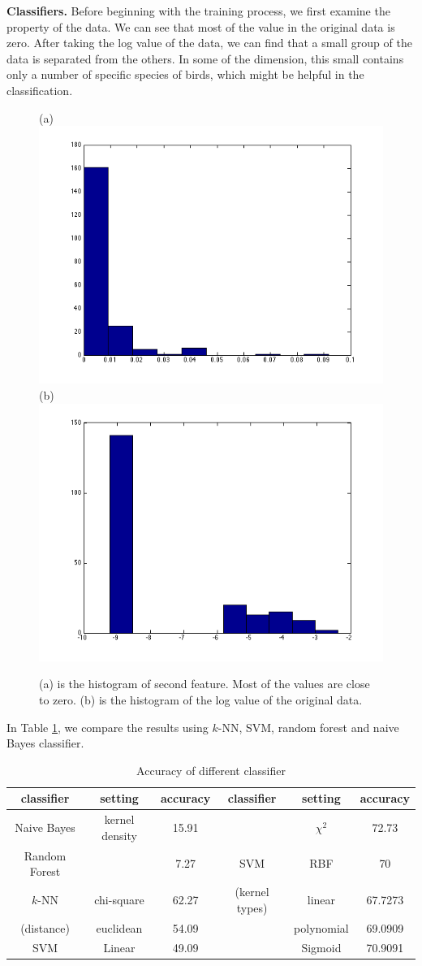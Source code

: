 \documentclass{article} %
\begin{document}
\textbf{Classifiers.}
Before beginning with the training process, we first examine the property of the data. We can see that most of the value in the original data is zero. After taking the log value of the data, we can find that a small group of the data is separated from the others. In some of the dimension, this small contains only a number of specific species of birds, which might be helpful in the classification.

\begin{figure}[b!]
    \centering
    {(a)\includegraphics[width=0.38\linewidth]{../Figure/Train_features}
    (b)\includegraphics[width=0.38\linewidth]{../Figure/Train_features_log}}
    \caption{(a) is the histogram of second feature. Most of the values are close to zero. (b) is the histogram of the log value of the original data.}
    \label{fig:hist}
\end{figure}


In Table \ref{tbl:classifers}, we compare the results using $k$-NN, SVM, random forest and naive Bayes classifier.


\begin{table}[t]
\caption{Accuracy of different classifier}
\begin{center}
\label{tbl:classifers}
\begin{tabular}{|c|c|c|c|c|c|}
\hline
   classifier  & setting      &accuracy   & classifier    & setting      & accuracy\\
\hline
Naive Bayes  & kernel density  & 15.91       &     &$\chi^2$  &72.73\\ \cline{1-3} \cline{5-6}
Random Forest &                & 7.27     &   SVM    & RBF               &70\\ \cline{1-3} \cline{5-6}
$k$-NN     & chi-square        & 62.27    &    (kernel types)    & linear            &67.7273\\ \cline{2-3} \cline{5-6}
(distance) & euclidean         & 54.09   &       & polynomial        &69.0909\\ \cline{1-3} \cline{5-6}
SVM& Linear  &49.09   &    & Sigmoid           &70.9091\\ \hline
\end{tabular}
\end{center}
\end{table}
\end{document}
